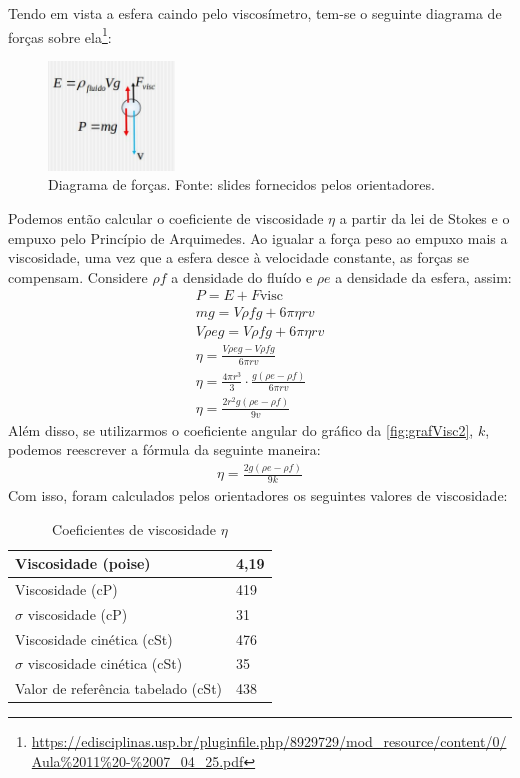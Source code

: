 Tendo em vista a esfera caindo pelo viscosímetro, tem-se o seguinte diagrama de forças sobre ela\footnote{\url{https://edisciplinas.usp.br/pluginfile.php/8929729/mod_resource/content/0/Aula\%2011\%20-\%2007_04_25.pdf}}:
\begin{figure}[H]
    \centering
    \includegraphics[width=0.3\textwidth]{fig/DiagramaDeForcas.png}
    \caption{Diagrama de forças. Fonte: slides fornecidos pelos orientadores.}
    \label{fig:grafVisc}
\end{figure}
Podemos então calcular o coeficiente de viscosidade \(\eta\) a partir da lei de Stokes e o empuxo pelo Princípio de Arquimedes. Ao igualar a força peso ao empuxo mais a viscosidade, uma vez que a esfera desce à velocidade constante, as forças se compensam. Considere \(\rho f\) a densidade do fluído e \(\rho e\) a densidade da esfera, assim:
\begin{align*}
    P = E + F\text{visc}
    \\
    mg = V \rho f g + 6 \pi \eta r v
    \\
    V \rho e g =  V \rho f g + 6 \pi \eta r v
    \\
    \eta = \frac{V \rho e g - V \rho f g}{6 \pi r v}
    \\
    \eta = \frac{4 \pi r^3}{3}\cdot \frac{ g (\rho e - \rho f)}{ 6 \pi r v}
    \\
    \eta = \frac{2 r^2 g (\rho e - \rho f)}{ 9 v}
\end{align*}
Além disso, se utilizarmos o coeficiente angular do gráfico da
\cref{fig:grafVisc2}, \(k\), podemos reescrever a fórmula da seguinte maneira:
\begin{align*}
    \eta = \frac{2 g (\rho e - \rho f)}{ 9 k}
\end{align*}
Com isso, foram calculados pelos orientadores os seguintes valores de viscosidade:
\begin{table}[H]
    \centering
    \caption{Coeficientes de viscosidade \(\eta\)}
    \begin{tabular}{|l|l|}
        \hline
        Viscosidade (poise) & 4,19  \\ \hline
        Viscosidade (cP) & 419 \\ \hline
        \(\sigma\) viscosidade (cP) & 31  \\ \hline
        Viscosidade cinética (cSt) & 476   \\ \hline
        \(\sigma\) viscosidade cinética (cSt) & 35  \\ \hline
        Valor de referência tabelado (cSt) & 438  \\ \hline
    \end{tabular}
\end{table}
